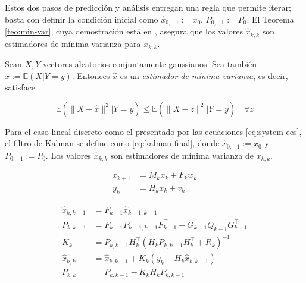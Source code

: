 Estos dos pasos de predicción y análisis entregan una regla que permite iterar; basta con definir la condición inicial como \(\hat{x}_{0,-1} := x_0\), \(P_{0,-1} := P_0\). El Teorema \ref{teo:min-var}, cuya demostración está en \cite{Anderson2005}, asegura que los valores \(\hat{x}_{k,k}\) son estimadores de mínima varianza para \(x_{k,k}\).

\begin{teo}
\label{teo:min-var}
Sean \(X, Y\) vectores aleatorios conjuntamente gaussianos. Sea también \(\hat{x} := \mathbb{E}(X|Y=y)\). Entonces \(\hat{x}\) es un
\emph{estimador de mínima varianza}, es decir, satisface

\[
\mathbb{E}(\| X - \hat{x}\|^2 | Y = y) \leq \mathbb{E}(\| X - z\|^2 | Y = y) \quad \forall z
\]
\end{teo}


\begin{mdframed}[style=mystyle,frametitle=Filtro de Kalman Lineal Discreto]

Para el caso lineal discreto como el presentado por las ecuaciones \ref{eq:system-ecs}, el filtro de Kalman se define como \ref{eq:kalman-final}, donde \(\hat{x}_{0,-1}:= x_0\) y \(P_{0,-1}:= P_0\). Los valores \(\hat{x}_{k,k}\) son estimadores de mínima varianza de \(x_{k,k}\). 

\begin{equation}\label{eq:system-ecs}
\begin{aligned}
x_{k+1} &= M_k x_k + F_k w_k \\ 
y_k &= H_k x_k + v_k
\end{aligned}
\end{equation}


\begin{equation}\label{eq:kalman-final}
\begin{aligned}
\hat{x}_{k,k-1} &= F_{k-1} \hat{x}_{k-1,k-1} \\
P_{k,k-1} &= F_{k-1} P_{k-1,k-1} F_{k-1}^{\top} + G_{k-1} Q_{k-1} G_{k-1}^{\top}\\
K_k &= P_{k,k-1} H^{\top}_{k}(H_{k}P_{k,k-1}H_{k}^{\top} + R_k)^{-1}\\
\hat{x}_{k,k} &= \hat{x}_{k, k-1} + K_k(y_k-H_k \hat{x}_{k,k-1}) \\
P_{k,k} &= P_{k,k-1}- K_k H_{k}P_{k,k-1} \\
\end{aligned}
\end{equation}

\end{mdframed}


